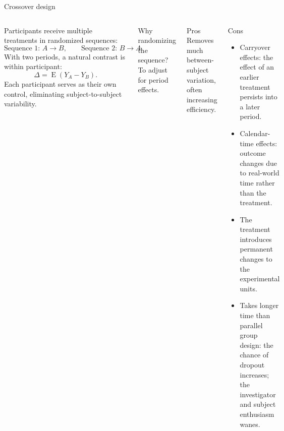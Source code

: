 \documentclass[aspectratio=169,11pt]{beamer}
\newcommand{\E}{\operatorname{E}}
\begin{document}
\begin{frame}{Crossover design}
  \begin{columns}[T]
      Participants receive multiple treatments in randomized sequences:
      \[
        \text{Sequence 1: } A \longrightarrow B,
        \qquad
        \text{Sequence 2: } B \longrightarrow A.
      \]
      With two periods, a natural contrast is within participant:
      \[
        \Delta = \E(Y_A-Y_B).
      \]
      Each participant serves as their own control, eliminating
      subject-to-subject variability.

      Why randomizing the sequence? To adjust for period effects.
      \footnotesize
      \begin{exampleblock}{Pros}
        Removes much between-subject variation, often increasing efficiency.
      \end{exampleblock}
      \vspace{-0.4em}
      \begin{alertblock}{Cons}
        \begin{itemize}
          \setlength{\itemsep}{0pt}
          \item Carryover effects: the effect of an earlier treatment persists
                into a later period.
          \item Calendar-time effects: outcome changes due to real-world time rather than
                the treatment.
          \item The treatment introduces permanent changes to the experimental units.
          \item Takes longer time than parallel group design:
                the chance of dropout increases; the investigator and subject
                enthusiasm wanes.
        \end{itemize}
      \end{alertblock}
  \end{columns}
\end{frame}
\end{document}
